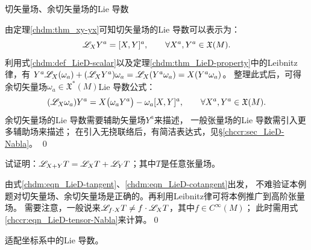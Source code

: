 \begin{example}
    切矢量场、余切矢量场的Lie 导数
\end{example}
由定理\ref{chdm:thm_xy-yx}可知切矢量场的Lie 导数可以表示为：
\begin{equation}\label{chdm:eqn_LieD-tangent}
    \mathscr{L}_{X} Y^{a} = [X, Y]^a , \qquad \forall X^a, Y^a \in \mathfrak{X}(M).
\end{equation}
利用式\eqref{chdm:def_LieD-scalar}以及定理\ref{chdm:thm_LieD-property}中的Leibnitz律，有
$  Y^a \mathscr{L}_{X}( \omega_a ) +(\mathscr{L}_{X}Y^a) \omega_a = \mathscr{L}_{X}(Y^a \omega_a )
     = X(Y^a \omega_a) $。
整理此式后，可得余切矢量场$\omega_a\in \mathfrak{X}^*(M)$Lie 导数公式：
\begin{equation}\label{chdm:eqn_LieD-cotangent}
    (\mathscr{L}_{X} \omega_a ) Y^a = X\bigl(\omega_a Y^a\bigr) 
    - \omega_a [X, Y]^a, \qquad \forall X^a, Y^a \in \mathfrak{X}(M).
\end{equation}
余切矢量场的Lie 导数需要辅助矢量场$Y^a$来描述，
一般张量场的Lie 导数需引入更多辅助场来描述；
在引入无挠联络后，有简洁表达式，见\S \ref{chccr:sec_LieD-Nabla}。
\qed

\begin{example}
    试证明：$\mathscr{L}_{X+Y} T = \mathscr{L}_{X} T  +\mathscr{L}_{Y} T $；其中$T$是任意张量场。
\end{example}
由式\eqref{chdm:eqn_LieD-tangent}、\eqref{chdm:eqn_LieD-cotangent}出发，
不难验证本例题对切矢量场、余切矢量场是正确的。再利用Leibnitz律可将本例推广到高阶张量场。
需要注意，一般说来$\mathscr{L}_{f\cdot X} T \neq f\cdot \mathscr{L}_{X} T$，其中$f\in C^\infty(M)$；
此时需用式\eqref{chccr:eqn_LieD-tensor-Nabla}来计算。\qed


\begin{example}
    适配坐标系中的Lie 导数。
\end{example}

